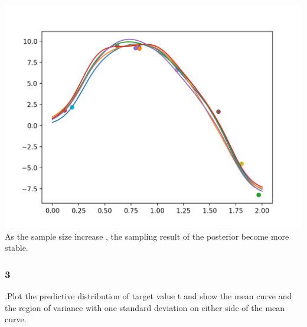 \documentclass{article}
\begin{document}
\includegraphics[width=\textwidth]{sample80_sample5.png}\\

As the sample size increase , the sampling result of the posterior become more stable.\\

\subsubsection*{3}.Plot the predictive distribution of target value t and show the mean curve and the region of variance with one standard deviation on either side of the mean curve.
\end{document}
